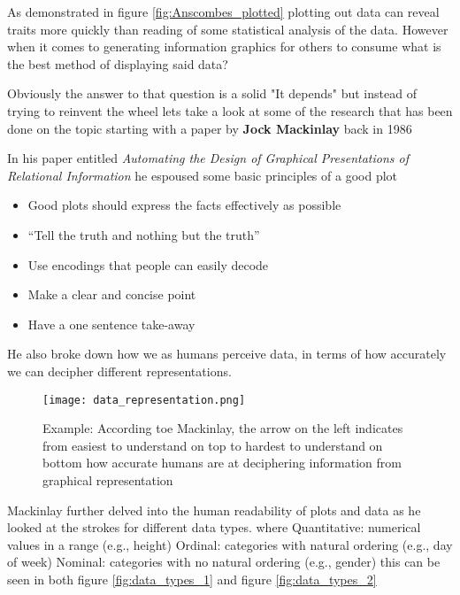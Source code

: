 \begin{flushleft}
As demonstrated in figure \ref{fig:Anscombes_plotted} plotting out data can reveal traits more quickly than reading of some statistical analysis of the data. However when it comes to generating information graphics for others to consume what is the best method of displaying said data?
\end{flushleft}
\begin{flushleft}
Obviously the answer to that question is a solid "It depends" but instead of trying to reinvent the wheel lets take a look at some of the research that has been done on the topic starting with a paper by \textbf{Jock Mackinlay} back in 1986
\end{flushleft}
\begin{flushleft}
In his paper entitled \textit{Automating the Design of Graphical Presentations of Relational Information} he espoused some basic principles of a good plot
    \begin{itemize}
        \item Good plots should express the facts eﬀectively as possible
        \item “Tell the truth and nothing but the truth”
        \item Use encodings that people can easily decode
        \item Make a clear and concise point
        \item Have a one sentence take-away
    \end{itemize}
\end{flushleft}
\begin{flushleft}
He also broke down how we as humans perceive data, in terms of how accurately we can decipher different representations.
\end{flushleft}
\begin{figure}[H]
    \centering
    \texttt{[image: data\_representation.png]}
    \caption{Example: According toe Mackinlay, the arrow on the left indicates from easiest to understand on top to hardest to understand on bottom how accurate humans are at deciphering information from graphical representation}
    \label{fig:data_representation}
\end{figure}
\begin{flushleft}
Mackinlay further delved into the human readability of plots and data as he looked at the strokes for different data types. where Quantitative: numerical values in a range (e.g., height) Ordinal: categories with natural ordering (e.g., day of week) Nominal: categories with no natural ordering (e.g., gender) this can be seen in both figure \ref{fig:data_types_1} and figure \ref{fig:data_types_2}
\end{flushleft}
